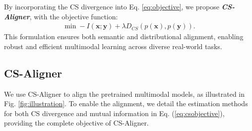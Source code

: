 By incorporating the CS divergence into Eq. \eqref{eq:objective}, we propose \textbf{\textit{CS-Aligner}}, with the objective function:
\begin{equation}
\begin{aligned}
\min  -I(\mathbf{x}; \mathbf{y}) + \lambda D_{CS}(p(\mathbf{x}), p(\mathbf{y})).
\end{aligned}
\label{eq:csobjective}
\end{equation}
 This formulation ensures both semantic and distributional alignment, enabling robust and efficient multimodal learning across diverse real-world tasks. 

 
\subsection{CS-Aligner}
We use CS-Aligner to align the pretrained multimodal models, as illustrated in Fig. \ref{fig:illustration}.
To enable the alignment, we detail the estimation methods for both CS divergence and mutual information in Eq. (\ref{eq:csobjective}), providing the complete objective of CS-Aligner.

